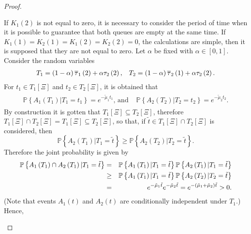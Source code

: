 \documentclass{article}
\newcommand{\prob}{\mathbb{P}}
\begin{document}
\begin{proof}
\begin{itemize}
If $K_{1}\left(2\right)$ is not equal to zero, it is necessary to consider the period of time when it is possible to guarantee that both queues are empty at the same time. If $K_{1}\left(1\right)=K_{2}\left(1\right)=K_{1}\left(2\right)=K_{2}\left(2\right)=0$,  the calculations are simple, then it is supposed that they are not equal to zero. 
Let $\alpha$ be fixed with $\alpha\in\left[0,1\right]$. Consider the random variables
\begin{eqnarray}\medskip
\begin{array}{ll}
T_{1}=\left(1-\alpha\right)\overline{\tau}_{1}\left(2\right)+\alpha\tau_{2}\left(2\right),&
T_{2}=\left(1-\alpha\right)\overline{\tau}_{2}\left(1\right)+\alpha\tau_{2}\left(2\right).
\end{array}
\end{eqnarray}
For $t_{1}\in T_{1}\left[\Xi\right]$ and $t_{2}\in T_{2}\left[\Xi\right]$, it is obtained that
\begin{eqnarray}
\begin{array}{ll}
\prob\left\{A_{1}\left(T_{1}\right)|T_{1}=t_{1}\right\}=e^{-\tilde{\mu}_{1}t_{1}}\textrm{, and }&
\prob\left\{A_{2}\left(T_{2}\right)|T_{2}=t_{2}\right\}=e^{-\tilde{\mu}_{2}t_{2}}.
\end{array}
\end{eqnarray}
By construction it is gotten that $T_{1}\left[\Xi\right]\subseteq T_{2}\left[\Xi\right]$, therefore  $T_{1}\left[\Xi\right]\cap T_{2}\left[\Xi\right]=T_{1}\left[\Xi\right]\subseteq T_{2}\left[\Xi\right]$, so that, if $\tilde{t}\in T_{1}\left[\Xi\right]\cap T_{2}\left[\Xi\right]$ is considered, then $$\prob\left\{A_{2}\left(T_{1}\right)|T_{1}=\tilde{t}\right\}\geq\prob\left\{A_{2}\left(T_{2}\right)|T_{2}=\tilde{t}\right\}.$$ Therefore the joint probability is given by
\begin{eqnarray*}\medskip
\prob\left\{A_{1}\left(T_{1}\right)\cap A_{2}\left(T_{1}\right)|T_{1}=\tilde{t}\right\}&=&\prob\left\{A_{1}\left(T_{1}\right)|T_{1}=\tilde{t}\right\}\prob\left\{A_{2}\left(T_{1}\right)|T_{1}=\tilde{t}\right\}\\\medskip
&\geq&\prob\left\{A_{1}\left(T_{1}\right)|T_{1}=\tilde{t}\right\}\prob\left\{A_{2}\left(T_{2}\right)|T_{2}=\tilde{t}\right\}\\
&=& e^{-\tilde{\mu}_{1}\tilde{t}}e^{-\tilde{\mu}_{2}\tilde{t}}
=e^{-\left(\tilde{\mu}_{1}+\tilde{\mu}_{2}\right)\tilde{t}}>0.
\end{eqnarray*}
(Note that events $A_{1}\left(t\right)$ and $A_{2}\left(t\right)$ are conditionally independent under $T_{1}$.)  Hence,

\end{itemize}
\end{proof}
\end{document}
